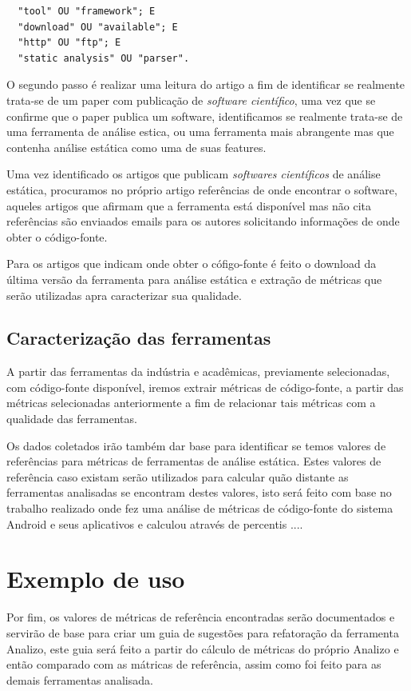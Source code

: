 \documentclass[qual, classic, a4paper]{ufbathesis}
\begin{document}
\begin{verbatim}
  "tool" OU "framework"; E
  "download" OU "available"; E
  "http" OU "ftp"; E
  "static analysis" OU "parser".
\end{verbatim}

O segundo passo é realizar uma leitura do artigo a fim de identificar se
realmente trata-se de um paper com publicação de {\it software científico},
uma vez que se confirme que o paper publica um software, identificamos se
realmente trata-se de uma ferramenta de análise estica, ou uma ferramenta mais
abrangente mas que contenha análise estática como uma de suas features.

Uma vez identificado os artigos que publicam {\it softwares científicos} de
análise estática, procuramos no próprio artigo referências de onde encontrar o
software, aqueles artigos que afirmam que a ferramenta está disponível mas não
cita referências são enviaados emails para os autores solicitando informações
de onde obter o código-fonte.

Para os artigos que indicam onde obter o cófigo-fonte é feito o download da
última versão da ferramenta para análise estática e extração de métricas que
serão utilizadas apra caracterizar sua qualidade.

\subsection{Caracterização das ferramentas}

A partir das ferramentas da indústria e acadêmicas, previamente selecionadas,
com código-fonte disponível, iremos extrair métricas de código-fonte, a partir
das métricas selecionadas anteriormente a fim de relacionar tais métricas com
a qualidade das ferramentas.

Os dados coletados irão também dar base para identificar se temos valores de
referências para métricas de ferramentas de análise estática. Estes valores de
referência caso existam serão utilizados para calcular quão distante as
ferramentas analisadas se encontram destes valores, isto será feito com base
no trabalho realizado \cite{Ronaldo2015} onde fez uma análise de métricas de
código-fonte do sistema Android e seus aplicativos e calculou através de
percentis ....

\section{Exemplo de uso}

Por fim, os valores de métricas de referência encontradas serão documentados e
servirão de base para criar um guia de sugestões para refatoração da
ferramenta Analizo, este guia será feito a partir do cálculo de métricas do
próprio Analizo e então comparado com as mátricas de referência, assim como
foi feito para as demais ferramentas analisada.
\end{document}
